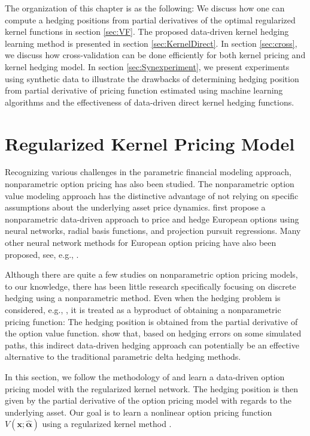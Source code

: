 \documentclass[letterpaper,12pt,titlepage,oneside,final]{book}
\numberwithin{equation}{section}
\theoremstyle{definition}
\newcommand{\vx}{\mathbf{x}}
\newcommand{\valpha}{\pmb{\widehat{\alpha}}}
\begin{document}
The organization of this chapter is as the following:
We discuss how one can compute a hedging positions from partial derivatives of the optimal regularized kernel functions in section \ref{sec:VF}. The proposed data-driven kernel hedging learning method is presented in section \ref{sec:KernelDirect}. In section \ref{sec:cross}, we discuss how cross-validation can be done efficiently for both kernel pricing and kernel hedging model. In section \ref{sec:Synexperiment}, we present experiments using synthetic data to illustrate the drawbacks of determining hedging position from partial derivative of pricing function estimated using machine learning algorithms and the effectiveness of data-driven direct kernel hedging functions.

\section{Regularized Kernel Pricing Model} 
\label{sec:RegularizedNW}
 Recognizing various challenges in the parametric financial modeling approach,
 nonparametric option pricing has also been studied. The nonparametric option value modeling approach has the distinctive advantage of not relying on specific assumptions about the underlying asset price dynamics. \citet{hutchinson} first propose a nonparametric data-driven approach to price and hedge European options using neural networks, radial basis functions, and projection pursuit regressions. Many other neural network methods for European option pricing have also been proposed, see, e.g., \citep{yao2000option,bennell2004black,gradojevic2009option,garcia2000pricing,malliaris1993neural}.


Although there are  quite a few studies on  nonparametric option pricing models, to our knowledge, there has been little research specifically focusing on discrete hedging using a nonparametric method. Even when the hedging problem is considered, e.g.,  \citep{hutchinson}, it is treated as a byproduct of obtaining a nonparametric  pricing function: The hedging position is obtained from the partial derivative of the option value function. \citet{hutchinson} show that, based on hedging errors on some simulated paths,  this indirect data-driven hedging approach can potentially be an effective alternative to the traditional parametric delta hedging methods.

In this section, we follow the methodology of \cite{hutchinson} and learn a data-driven option pricing model with the regularized kernel network. The hedging position is then given by the partial derivative of the option pricing model with regards to the underlying asset. Our goal is to learn a nonlinear option pricing function $V(\vx;\valpha)$  using a regularized kernel method \cite{evgeniou2000regularization}. 
\end{document}
